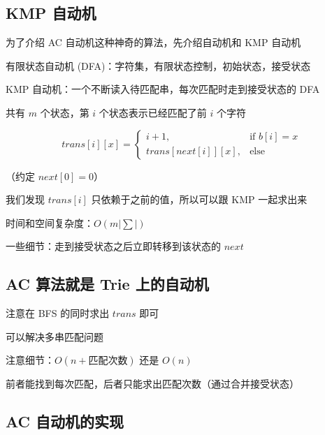 
\subsection{KMP 自动机}

为了介绍 AC 自动机这种神奇的算法，先介绍自动机和 KMP 自动机

有限状态自动机 (DFA)：字符集，有限状态控制，初始状态，接受状态

KMP 自动机：一个不断读入待匹配串，每次匹配时走到接受状态的 DFA

共有 $m$ 个状态，第 $i$ 个状态表示已经匹配了前 $i$ 个字符

$$
trans[i][x] =
\begin{cases}
i + 1,  & \text{if $b[i] = x$} \\[2ex]
trans[next[i]][x], & \text{else}
\end{cases}
$$

（约定 $next[0]=0$）

我们发现 $trans[i]$ 只依赖于之前的值，所以可以跟  KMP  一起求出来

时间和空间复杂度：$O(m|∑|)$

一些细节：走到接受状态之后立即转移到该状态的 $next$

\subsection{AC 算法就是 Trie 上的自动机}

注意在  BFS  的同时求出 $trans$ 即可

可以解决多串匹配问题

注意细节：$O(n+匹配次数)$ 还是 $O(n)$

前者能找到每次匹配，后者只能求出匹配次数（通过合并接受状态）

\subsection{AC 自动机的实现}
